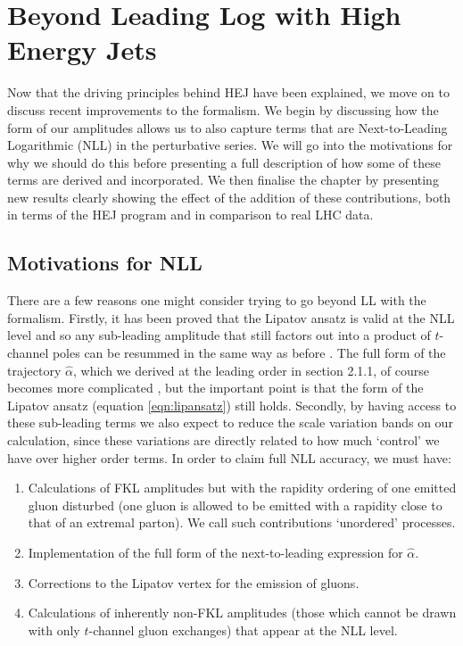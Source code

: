 \chapter{Beyond Leading Log with High Energy Jets}

Now that the driving principles behind HEJ have been explained, we move on to discuss recent improvements to the formalism. We begin by discussing how the form of our amplitudes allows us to also capture terms that are Next-to-Leading Logarithmic (NLL) in the perturbative series. We will go into the motivations for why we should do this before presenting a full description of how some of these terms are derived and incorporated. We then finalise the chapter by presenting new results clearly showing the effect of the addition of these contributions, both in terms of the HEJ program and in comparison to real LHC data. 

\section{Motivations for NLL}

There are a few reasons one might consider trying to go beyond LL with the formalism. Firstly, it has been proved that the Lipatov ansatz is valid at the NLL level and so any sub-leading amplitude that still factors out into a product of $t$-channel poles can be resummed in the same way as before \cite{Fadin2006}. The full form of the trajectory $\hat{\alpha}$, which we derived at the leading order in section 2.1.1, of course becomes more complicated \cite{Fadin2003}, but the important point is that the form of the Lipatov ansatz (equation \ref{eqn:lipansatz}) still holds. Secondly, by having access to these sub-leading terms we also expect to reduce the scale variation bands on our calculation, since these variations are directly related to how much `control' we have over higher order terms. In order to claim full NLL accuracy, we must have:

\begin{enumerate}
\item{Calculations of FKL amplitudes but with the rapidity ordering of one emitted gluon disturbed (one gluon is allowed to be emitted with a rapidity close to that of an extremal parton). We call such contributions `unordered' processes.}
\item{Implementation of the full form of the next-to-leading expression for $\hat{\alpha}$.}
\item{Corrections to the Lipatov vertex for the emission of gluons.}
\item{Calculations of inherently non-FKL amplitudes (those which cannot be drawn with only $t$-channel gluon exchanges) that appear at the NLL level.}
\end{enumerate}

